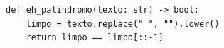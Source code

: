\ifmostrarGabarito
\begin{verbatim}
def eh_palindromo(texto: str) -> bool:
    limpo = texto.replace(" ", "").lower()
    return limpo == limpo[::-1]
\end{verbatim}

\fi
